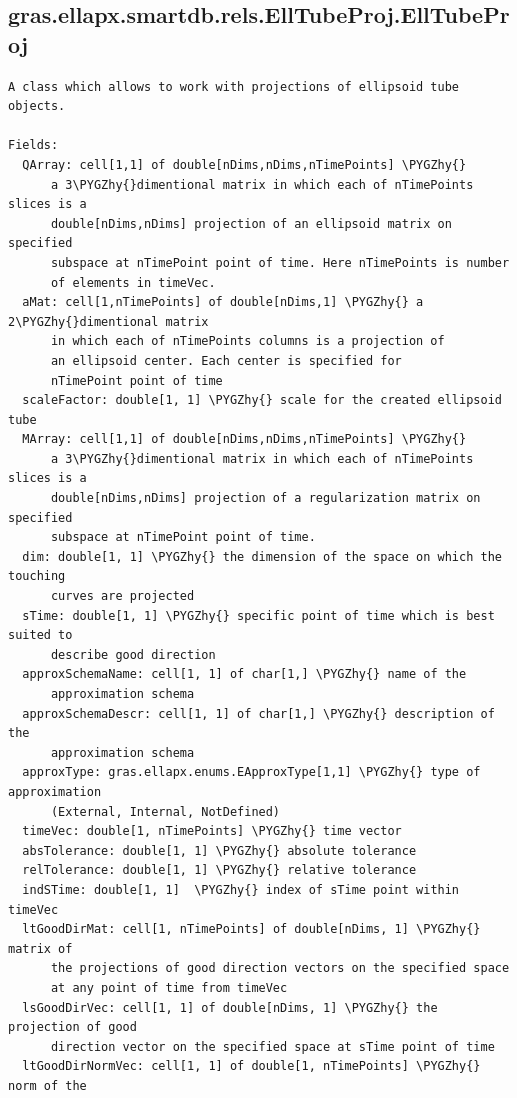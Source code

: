 \documentclass[letterpaper,10pt,english]{sphinxmanual}
\def\PYGZhy{\char`\-}
\begin{document}
\subsection{gras.ellapx.smartdb.rels.EllTubeProj.EllTubeProj}
\label{chap_functions:gras-ellapx-smartdb-rels-elltubeproj-elltubeproj}
\begin{Verbatim}[commandchars=\\\{\}]
A class which allows to work with projections of ellipsoid tube objects.

Fields:
  QArray: cell[1,1] of double[nDims,nDims,nTimePoints] \PYGZhy{}
      a 3\PYGZhy{}dimentional matrix in which each of nTimePoints slices is a
      double[nDims,nDims] projection of an ellipsoid matrix on specified
      subspace at nTimePoint point of time. Here nTimePoints is number
      of elements in timeVec.
  aMat: cell[1,nTimePoints] of double[nDims,1] \PYGZhy{} a 2\PYGZhy{}dimentional matrix
      in which each of nTimePoints columns is a projection of
      an ellipsoid center. Each center is specified for
      nTimePoint point of time
  scaleFactor: double[1, 1] \PYGZhy{} scale for the created ellipsoid tube
  MArray: cell[1,1] of double[nDims,nDims,nTimePoints] \PYGZhy{}
      a 3\PYGZhy{}dimentional matrix in which each of nTimePoints slices is a
      double[nDims,nDims] projection of a regularization matrix on specified
      subspace at nTimePoint point of time.
  dim: double[1, 1] \PYGZhy{} the dimension of the space on which the touching
      curves are projected
  sTime: double[1, 1] \PYGZhy{} specific point of time which is best suited to
      describe good direction
  approxSchemaName: cell[1, 1] of char[1,] \PYGZhy{} name of the
      approximation schema
  approxSchemaDescr: cell[1, 1] of char[1,] \PYGZhy{} description of the
      approximation schema
  approxType: gras.ellapx.enums.EApproxType[1,1] \PYGZhy{} type of approximation
      (External, Internal, NotDefined)
  timeVec: double[1, nTimePoints] \PYGZhy{} time vector
  absTolerance: double[1, 1] \PYGZhy{} absolute tolerance
  relTolerance: double[1, 1] \PYGZhy{} relative tolerance
  indSTime: double[1, 1]  \PYGZhy{} index of sTime point within timeVec
  ltGoodDirMat: cell[1, nTimePoints] of double[nDims, 1] \PYGZhy{} matrix of
      the projections of good direction vectors on the specified space
      at any point of time from timeVec
  lsGoodDirVec: cell[1, 1] of double[nDims, 1] \PYGZhy{} the projection of good
      direction vector on the specified space at sTime point of time
  ltGoodDirNormVec: cell[1, 1] of double[1, nTimePoints] \PYGZhy{} norm of the

\end{Verbatim}
\end{document}
